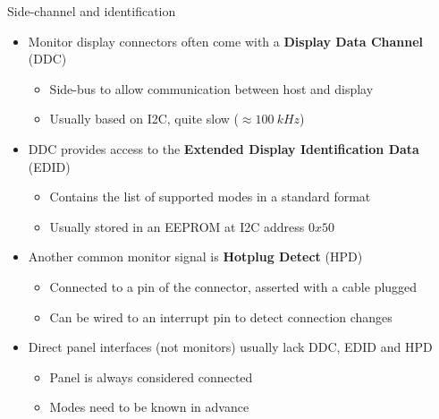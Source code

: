 \begin{frame}{Side-channel and identification}
  \begin{itemize}
  \item Monitor display connectors often come with a \textbf{Display Data Channel} (DDC)
    \begin{itemize}
    \item Side-bus to allow communication between host and display
    \item Usually based on I2C, quite slow (\(\approx 100~kHz\))
    \end{itemize}
  \item DDC provides access to the \textbf{Extended Display Identification Data} (EDID)
    \begin{itemize}
    \item Contains the list of supported modes in a standard format
    \item Usually stored in an EEPROM at I2C address \(0x50\)
    \end{itemize}
  \item Another common monitor signal is \textbf{Hotplug Detect} (HPD)
    \begin{itemize}
    \item Connected to a pin of the connector, asserted with a cable plugged
    \item Can be wired to an interrupt pin to detect connection changes
    \end{itemize}
  \item Direct panel interfaces (not monitors) usually lack DDC, EDID and HPD
    \begin{itemize}
      \item Panel is always considered connected
      \item Modes need to be known in advance
    \end{itemize}
  \end{itemize}
\end{frame}

